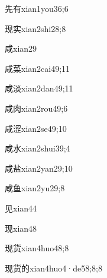 \begin{verbete}{先有}{xian1you3}{6;6}
\end{verbete}
\begin{verbete}{现实}{xian2shi2}{8;8}
\end{verbete}
\begin{verbete}{咸}{xian2}{9}
\end{verbete}
\begin{verbete}{咸菜}{xian2cai4}{9;11}
\end{verbete}
\begin{verbete}{咸淡}{xian2dan4}{9;11}
\end{verbete}
\begin{verbete}{咸肉}{xian2rou4}{9;6}
\end{verbete}
\begin{verbete}{咸涩}{xian2se4}{9;10}
\end{verbete}
\begin{verbete}{咸水}{xian2shui3}{9;4}
\end{verbete}
\begin{verbete}{咸盐}{xian2yan2}{9;10}
\end{verbete}
\begin{verbete}{咸鱼}{xian2yu2}{9;8}
\end{verbete}
\begin{verbete}{见}{xian4}{4}
\end{verbete}
\begin{verbete}{现}{xian4}{8}
\end{verbete}
\begin{verbete}{现货}{xian4huo4}{8;8}
\end{verbete}
\begin{verbete}{现货的}{xian4huo4·de5}{8;8;8}
\end{verbete}
